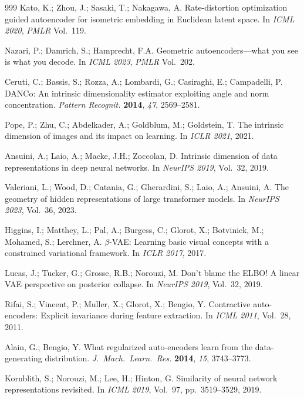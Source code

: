 \documentclass[make,article,submit,pdftex,moreauthors]{Definitions/mdpi}
\begin{document}
\begin{thebibliography}{999}
Kato, K.; Zhou, J.; Sasaki, T.; Nakagawa, A.
Rate-distortion optimization guided autoencoder for isometric embedding in
Euclidean latent space.
In \textit{ICML 2020}, \textit{PMLR} Vol.~119.

Nazari, P.; Damrich, S.; Hamprecht, F.A.
Geometric autoencoders---what you see is what you decode.
In \textit{ICML 2023}, \textit{PMLR} Vol.~202.

Ceruti, C.; Bassis, S.; Rozza, A.; Lombardi, G.; Casiraghi, E.;
Campadelli, P.
DANCo: An intrinsic dimensionality estimator exploiting angle and norm
concentration.
\textit{Pattern Recognit.} \textbf{2014}, \textit{47}, 2569--2581.

Pope, P.; Zhu, C.; Abdelkader, A.; Goldblum, M.; Goldstein, T.
The intrinsic dimension of images and its impact on learning.
In \textit{ICLR 2021}, 2021.

Ansuini, A.; Laio, A.; Macke, J.H.; Zoccolan, D.
Intrinsic dimension of data representations in deep neural networks.
In \textit{NeurIPS 2019}, Vol.~32, 2019.

Valeriani, L.; Wood, D.; Catania, G.; Gherardini, S.; Laio, A.; Ansuini, A.
The geometry of hidden representations of large transformer models.
In \textit{NeurIPS 2023}, Vol.~36, 2023.

Higgins, I.; Matthey, L.; Pal, A.; Burgess, C.; Glorot, X.; Botvinick, M.;
Mohamed, S.; Lerchner, A.
$\beta$-VAE: Learning basic visual concepts with a constrained variational
framework.
In \textit{ICLR 2017}, 2017.

Lucas, J.; Tucker, G.; Grosse, R.B.; Norouzi, M.
Don't blame the ELBO! A linear VAE perspective on posterior collapse.
In \textit{NeurIPS 2019}, Vol.~32, 2019.

Rifai, S.; Vincent, P.; Muller, X.; Glorot, X.; Bengio, Y.
Contractive auto-encoders: Explicit invariance during feature extraction.
In \textit{ICML 2011}, Vol.~28, 2011.

Alain, G.; Bengio, Y.
What regularized auto-encoders learn from the data-generating distribution.
\textit{J.\ Mach.\ Learn.\ Res.} \textbf{2014}, \textit{15}, 3743--3773.

Kornblith, S.; Norouzi, M.; Lee, H.; Hinton, G.
Similarity of neural network representations revisited.
In \textit{ICML 2019}, Vol.~97, pp.~3519--3529, 2019.

\end{thebibliography}
\end{document}
